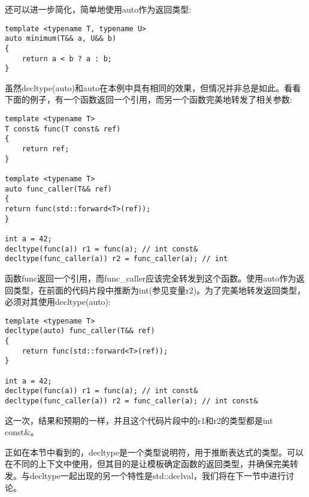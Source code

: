 还可以进一步简化，简单地使用auto作为返回类型:

\begin{lstlisting}[style=styleCXX]
template <typename T, typename U>
auto minimum(T&& a, U&& b)
{
	return a < b ? a : b;
}
\end{lstlisting}

虽然decltype(auto)和auto在本例中具有相同的效果，但情况并非总是如此。看看下面的例子，有一个函数返回一个引用，而另一个函数完美地转发了相关参数:

\begin{lstlisting}[style=styleCXX]
template <typename T>
T const& func(T const& ref)
{
	return ref;
}

template <typename T>
auto func_caller(T&& ref)
{
return func(std::forward<T>(ref));
}

int a = 42;
decltype(func(a)) r1 = func(a); // int const&
decltype(func_caller(a)) r2 = func_caller(a); // int
\end{lstlisting}

函数func返回一个引用，而func\_caller应该完全转发到这个函数。使用auto作为返回类型，在前面的代码片段中推断为int(参见变量r2)。为了完美地转发返回类型，必须对其使用decltype(auto):

\begin{lstlisting}[style=styleCXX]
template <typename T>
decltype(auto) func_caller(T&& ref)
{
	return func(std::forward<T>(ref));
}

int a = 42;
decltype(func(a)) r1 = func(a); // int const&
decltype(func_caller(a)) r2 = func_caller(a); // int const&
\end{lstlisting}

这一次，结果和预期的一样，并且这个代码片段中的r1和r2的类型都是int const\&。

正如在本节中看到的，decltype是一个类型说明符，用于推断表达式的类型。可以在不同的上下文中使用，但其目的是让模板确定函数的返回类型，并确保完美转发。与decltype一起出现的另一个特性是std::declval，我们将在下一节中进行讨论。









